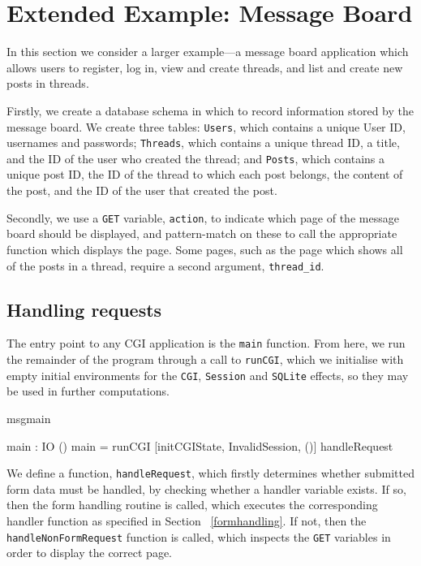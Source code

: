 \section{Extended Example: Message Board}
\label{messageboard}
In this section we consider a larger example---a message board application
which allows users to register, log in, view and create threads, and list and
create new posts in threads. 

Firstly, we create a database schema in which to record information stored by
the message board. We create three tables: \texttt{Users}, which contains a
unique User ID, usernames and passwords; \texttt{Threads}, which contains a
unique thread ID, a title, and the ID of the user who created the thread; and
\texttt{Posts}, which contains a unique post ID, the ID of the thread to which
each post belongs, the content of the post, and the ID of the user that created
the post.

Secondly, we use a \texttt{GET} variable, \texttt{action}, to indicate which page of the
message board should be displayed, and pattern-match on these to call the
appropriate function which displays the page. Some pages, such as the page
which shows all of the posts in a thread, require a second argument,
\texttt{thread\_id}.  

\subsection{Handling requests}
The entry point to any CGI application is the \texttt{main} function. From
here, we run the remainder of the program through a call to \texttt{runCGI},
which we initialise with empty initial environments for the \texttt{CGI}, 
\texttt{Session} and
\texttt{SQLite} effects, so they may be used in further computations. 

\begin{SaveVerbatim}{msgmain}

main : IO ()
main = runCGI [initCGIState, InvalidSession, ()] 
              handleRequest

\end{SaveVerbatim}

\noindent
We define a function, \texttt{handleRequest}, which firstly determines
whether submitted form data must be handled, by checking whether a handler
variable exists.
If so, then the form handling routine is called, which executes the
corresponding handler function as specified in Section ~\ref{formhandling}. If
not, then the \texttt{handleNonFormRequest} function is called, which inspects
the \texttt{GET} variables in order to display the correct page.

